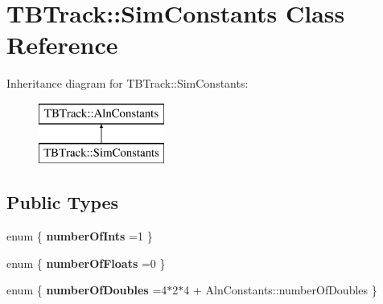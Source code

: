 \section{T\-B\-Track\-:\-:Sim\-Constants Class Reference}
\label{classTBTrack_1_1SimConstants}
Inheritance diagram for T\-B\-Track\-:\-:Sim\-Constants\-:\begin{figure}[H]
\begin{center}
\leavevmode
\includegraphics[height=2.000000cm]{classTBTrack_1_1SimConstants}
\end{center}
\end{figure}
\subsection*{Public Types}
\begin{DoxyCompactItemize}
\item 
enum \{ {\bfseries number\-Of\-Ints} =1
 \}
\item 
enum \{ {\bfseries number\-Of\-Floats} =0
 \}
\item 
enum \{ {\bfseries number\-Of\-Doubles} =4$\ast$2$\ast$4 + Aln\-Constants\-:\-:number\-Of\-Doubles
 \}
\end{DoxyCompactItemize}
